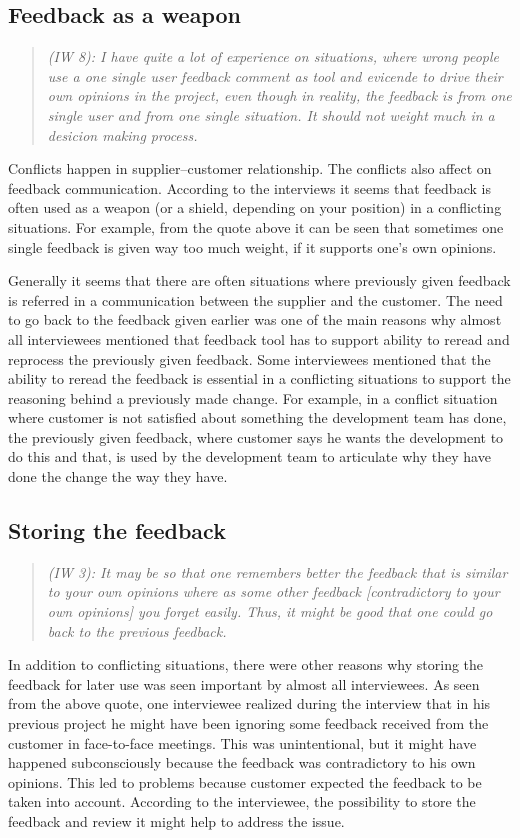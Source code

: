 \documentclass[english,12pt,a4paper,pdftex]{article}
\newcommand{\q}[2]{
\begin{quote}
\emph{(IW #1): #2}
\end{quote}}
\begin{document}
\subsection{Feedback as a weapon}

\q{8}{I have quite a lot of experience on situations, where wrong people use a one single user feedback comment as tool and evicende to drive their own opinions in the project, even though in reality, the feedback is from one single user and from one single situation. It should not weight much in a desicion making process.}

Conflicts happen in supplier--customer relationship. The conflicts also affect on feedback communication. According to the interviews it seems that feedback is often used as a weapon (or a shield, depending on your position) in a conflicting situations. For example, from the quote above it can be seen that sometimes one single feedback is given way too much weight, if it supports one's own opinions.

Generally it seems that there are often situations where previously given feedback is referred in a communication between the supplier and the customer. The need to go back to the feedback given earlier was one of the main reasons why almost all interviewees mentioned that feedback tool has to support ability to reread and reprocess the previously given feedback. Some interviewees mentioned that the ability to reread the feedback is essential in a conflicting situations to support the reasoning behind a previously made change. For example, in a conflict situation where customer is not satisfied about something the development team has done, the previously given feedback, where customer says he wants the development to do this and that, is used by the development team to articulate why they have done the change the way they have.

\subsection{Storing the feedback}

\q{3}{It may be so that one remembers better the feedback that is similar to your own opinions where as some other feedback [contradictory to your own opinions] you forget easily. Thus, it might be good that one could go back to the previous feedback.}

In addition to conflicting situations, there were other reasons why storing the feedback for later use was seen important by almost all interviewees. As seen from the above quote, one interviewee realized during the interview that in his previous project he might have been ignoring some feedback received from the customer in face-to-face meetings. This was unintentional, but it might have happened subconsciously because the feedback was contradictory to his own opinions. This led to problems because customer expected the feedback to be taken into account. According to the interviewee, the possibility to store the feedback and review it might help to address the issue.
\end{document}
